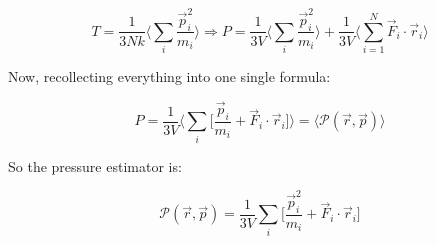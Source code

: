	$$T = \frac{1}{3Nk}\biggl\langle\sum\limits_i\frac{\vec{p}_i^2}{m_i}\biggr\rangle\Rightarrow P = \frac{1}{3V}\biggl\langle\sum\limits_i\frac{\vec{p}^2_i}{m_i}\biggr\rangle + \frac{1}{3V}\biggl\langle\sum\limits_{i=1}^N\vec{F}_i\cdot\vec{r}_i\biggr\rangle$$

	Now, recollecting everything into one single formula:

	$$P = \frac{1}{3V}\biggl\langle\sum\limits_i\biggl[\frac{\vec{p}_i}{m_i}+ \vec{F}_i\cdot\vec{r}_i\biggr]\biggr\rangle = \langle\mathcal{P}(\vec{r}, \vec{p})\rangle$$

	So the pressure estimator is:

	$$\mathcal{P}(\vec{r}, \vec{p}) = \frac{1}{3V}\sum\limits_i\biggl[\frac{\vec{p}_i^2}{m_i}+ \vec{F}_i\cdot\vec{r}_i\biggr]$$
